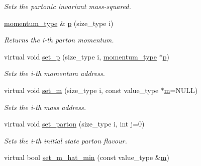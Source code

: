 \begin{DoxyCompactItemize}
\begin{DoxyCompactList}\small\item\em Sets the partonic invariant mass-\/squared. \end{DoxyCompactList}\item 
\hypertarget{a00308_a0ca7624c4465f3faca039b45d9705f22}{}\hyperlink{a00579}{momentum\+\_\+type} \& \hyperlink{a00308_a0ca7624c4465f3faca039b45d9705f22}{p} (size\+\_\+type i)\label{a00308_a0ca7624c4465f3faca039b45d9705f22}

\begin{DoxyCompactList}\small\item\em Returns the i-\/th parton momentum. \end{DoxyCompactList}\item 
\hypertarget{a00308_a427f63b82bb183b500a4f04243d9293e}{}virtual void \hyperlink{a00308_a427f63b82bb183b500a4f04243d9293e}{set\+\_\+p} (size\+\_\+type i, \hyperlink{a00579}{momentum\+\_\+type} $\ast$\hyperlink{a00308_a0ca7624c4465f3faca039b45d9705f22}{p})\label{a00308_a427f63b82bb183b500a4f04243d9293e}

\begin{DoxyCompactList}\small\item\em Sets the i-\/th momentum address. \end{DoxyCompactList}\item 
\hypertarget{a00308_aa7b36a6f9e3a0f18d8e8b8d55f5ebf1f}{}virtual void \hyperlink{a00308_aa7b36a6f9e3a0f18d8e8b8d55f5ebf1f}{set\+\_\+m} (size\+\_\+type i, const value\+\_\+type $\ast$\hyperlink{a00308_a2a95cea4e7fd1e59bf96fed7225afdf2}{m}=N\+U\+L\+L)\label{a00308_aa7b36a6f9e3a0f18d8e8b8d55f5ebf1f}

\begin{DoxyCompactList}\small\item\em Sets the i-\/th mass address. \end{DoxyCompactList}\item 
\hypertarget{a00308_a87937949a015172c8a447e09b3b66f99}{}virtual void \hyperlink{a00308_a87937949a015172c8a447e09b3b66f99}{set\+\_\+parton} (size\+\_\+type i, int j=0)\label{a00308_a87937949a015172c8a447e09b3b66f99}

\begin{DoxyCompactList}\small\item\em Sets the i-\/th initial state parton flavour. \end{DoxyCompactList}\item 
\hypertarget{a00308_a92767ab9fff688b4c92a21fb9d49f7cd}{}virtual bool \hyperlink{a00308_a92767ab9fff688b4c92a21fb9d49f7cd}{set\+\_\+m\+\_\+hat\+\_\+min} (const value\+\_\+type \&\hyperlink{a00308_a2a95cea4e7fd1e59bf96fed7225afdf2}{m})\label{a00308_a92767ab9fff688b4c92a21fb9d49f7cd}


\end{DoxyCompactItemize}

